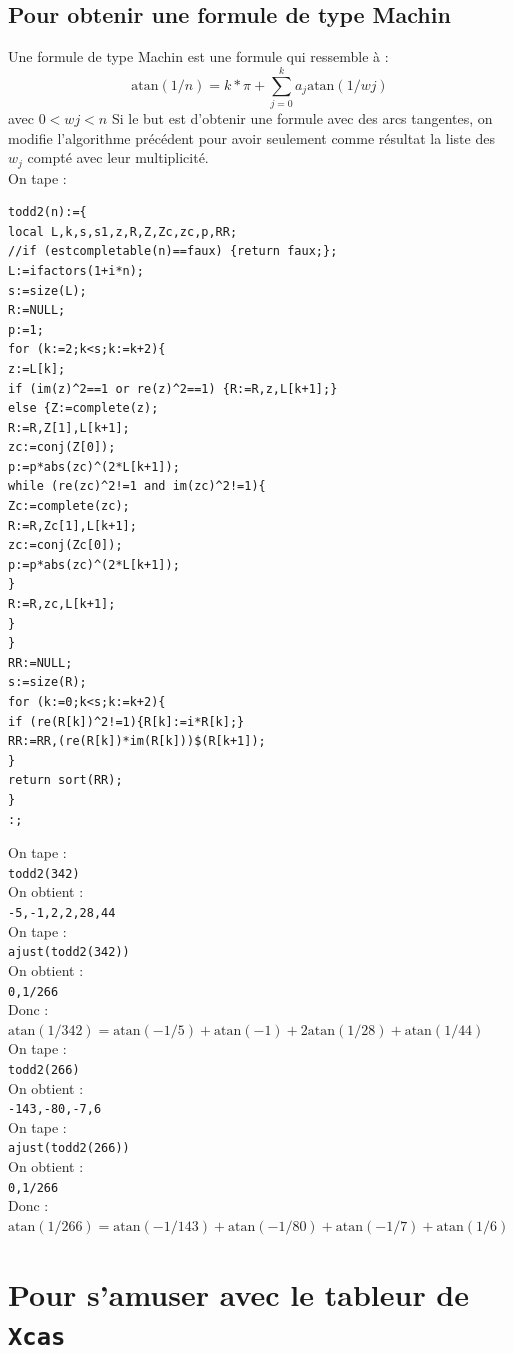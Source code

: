 \documentclass[a4paper,11pt]{book}
\newcommand{\atan}{\mbox{atan}}
\begin{document}
\section{Pour obtenir une formule de type Machin}
Une formule de type Machin est une formule qui ressemble \`a :
$$\atan(1/n)=k*\pi+\sum_{j=0}^ka_j\atan(1/wj)$$ avec $0<wj<n$
Si le but est d'obtenir une formule avec des arcs tangentes, on modifie 
l'algorithme pr\'ec\'edent pour avoir seulement comme r\'esultat la liste des 
$w_j$ compt\'e avec leur multiplicit\'e.\\
On tape :
\begin{verbatim} 
todd2(n):={
local L,k,s,s1,z,R,Z,Zc,zc,p,RR;
//if (estcompletable(n)==faux) {return faux;};
L:=ifactors(1+i*n);
s:=size(L);
R:=NULL;
p:=1;
for (k:=2;k<s;k:=k+2){
z:=L[k];
if (im(z)^2==1 or re(z)^2==1) {R:=R,z,L[k+1];}
else {Z:=complete(z);
R:=R,Z[1],L[k+1];
zc:=conj(Z[0]);
p:=p*abs(zc)^(2*L[k+1]);
while (re(zc)^2!=1 and im(zc)^2!=1){
Zc:=complete(zc);
R:=R,Zc[1],L[k+1];
zc:=conj(Zc[0]);
p:=p*abs(zc)^(2*L[k+1]);
}
R:=R,zc,L[k+1];
}
}
RR:=NULL;
s:=size(R);
for (k:=0;k<s;k:=k+2){
if (re(R[k])^2!=1){R[k]:=i*R[k];}
RR:=RR,(re(R[k])*im(R[k]))$(R[k+1]);
}
return sort(RR);
}
:;
\end{verbatim}
On tape :\\
{\tt todd2(342)}\\
On obtient :\\
{\tt -5,-1,2,2,28,44}\\
On tape :\\
{\tt ajust(todd2(342))}\\
On obtient :\\
{\tt 0,1/266}\\
Donc :\\
$\atan(1/342)=\atan(-1/5)+\atan(-1)+2\atan(1/28)+\atan(1/44)$\\
On tape :\\
{\tt todd2(266)}\\
On obtient :\\
{\tt -143,-80,-7,6}\\
On tape :\\
{\tt ajust(todd2(266))}\\
On obtient :\\
{\tt 0,1/266}\\
Donc :\\
$\atan(1/266)=\atan(-1/143)+\atan(-1/80)+\atan(-1/7)+\atan(1/6)$

\chapter{Pour s'amuser avec le tableur de {\tt Xcas}}
\end{document}
